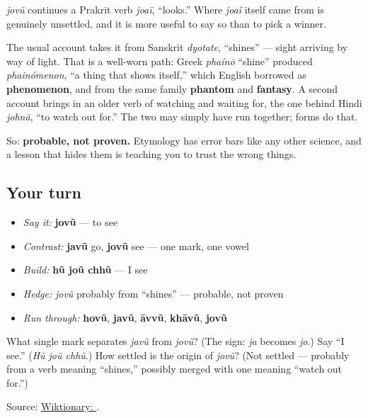 \begin{cousinweb}
\emph{jovũ} continues a Prakrit verb \emph{joaï}, \textquotedblleft{}looks.\textquotedblright{} Where \emph{joaï} itself came from is genuinely unsettled, and it is more useful to say so than to pick a winner.

The usual account takes it from Sanskrit \emph{dyotate}, \textquotedblleft{}shines\textquotedblright{} — sight arriving by way of light. That is a well-worn path: Greek \emph{phaínō} \textquotedblleft{}shine\textquotedblright{} produced \emph{phainómenon}, \textquotedblleft{}a thing that shows itself,\textquotedblright{} which English borrowed as \textbf{phenomenon}, and from the same family \textbf{phantom} and \textbf{fantasy}. A second account brings in an older verb of watching and waiting for, the one behind Hindi \emph{johnā}, \textquotedblleft{}to watch out for.\textquotedblright{} The two may simply have run together; forms do that.

So: \textbf{probable, not proven.} Etymology has error bars like any other science, and a lesson that hides them is teaching you to trust the wrong things.
\end{cousinweb}

\subsection*{Your turn}
\begin{itemize}
\raggedright
  \item \emph{Say it:} \textbf{jovũ} — to see
  \item \emph{Contrast:} \textbf{javũ} go, \textbf{jovũ} see — one mark, one vowel
  \item \emph{Build:} \textbf{hũ joũ chhũ} — I see
  \item \emph{Hedge:} \emph{jovũ} probably from \textquotedblleft{}shines\textquotedblright{} — probable, not proven
  \item \emph{Run through:} \textbf{hovũ}, \textbf{javũ}, \textbf{āvvũ}, \textbf{khāvũ}, \textbf{jovũ}
\end{itemize}

\begin{tcolorbox}[breakable,colback=teal!4,colframe=teal!35!black,title={Before you move on}]
What single mark separates \emph{javũ} from \emph{jovũ}? (The \textbf{} sign: \emph{ja} becomes \emph{jo}.) Say \textquotedblleft{}I see.\textquotedblright{} (\emph{Hũ joũ chhũ}.) How settled is the origin of \emph{jovũ}? (Not settled — probably from a verb meaning \textquotedblleft{}shines,\textquotedblright{} possibly merged with one meaning \textquotedblleft{}watch out for.\textquotedblright{})

Source: \href{https://en.wiktionary.org/wiki/\%E0\%AA\%9C\%E0\%AB\%8B\%E0\%AA\%B5\%E0\%AB\%81\%E0\%AA\%82}{Wiktionary: }.
\end{tcolorbox}
